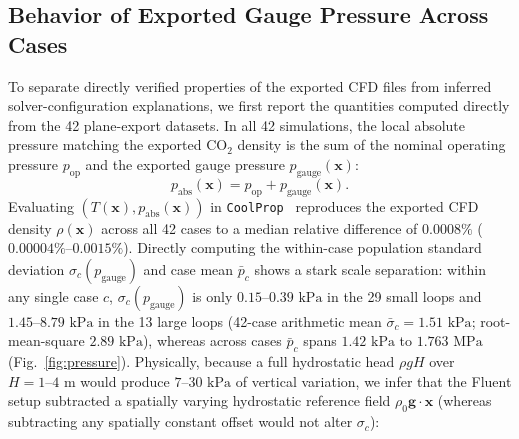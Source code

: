 \documentclass[11pt]{article}
\begin{document}
\subsection{Behavior of Exported Gauge Pressure Across Cases}
To separate directly verified properties of the exported CFD files from inferred solver-configuration explanations, we first report the quantities computed directly from the 42 plane-export datasets. In all 42 simulations, the local absolute pressure matching the exported $\mathrm{CO}_2$ density is the sum of the nominal operating pressure $p_{\mathrm{op}}$ and the exported gauge pressure $p_{\mathrm{gauge}}(\mathbf{x})$:
\begin{equation}
  p_{\mathrm{abs}}(\mathbf{x}) = p_{\mathrm{op}} + p_{\mathrm{gauge}}(\mathbf{x}).
  \label{eq:piezometric}
\end{equation}
Evaluating $(T(\mathbf{x}), p_{\mathrm{abs}}(\mathbf{x}))$ in \texttt{CoolProp}~\cite{span1996new,bell2014pure} reproduces the exported CFD density $\rho(\mathbf{x})$ across all 42 cases to a median relative difference of $0.0008\%$ ($0.00004\%\text{--}0.0015\%$). Directly computing the within-case population standard deviation $\sigma_c(p_{\mathrm{gauge}})$ and case mean $\bar{p}_c$ shows a stark scale separation: within any single case $c$, $\sigma_c(p_{\mathrm{gauge}})$ is only $0.15\text{--}0.39\text{ kPa}$ in the 29 small loops and $1.45\text{--}8.79\text{ kPa}$ in the 13 large loops (42-case arithmetic mean $\bar{\sigma}_c = 1.51\text{ kPa}$; root-mean-square $2.89\text{ kPa}$), whereas across cases $\bar{p}_c$ spans $1.42\text{ kPa}$ to $1.763\text{ MPa}$ (Fig.~\ref{fig:pressure}). Physically, because a full hydrostatic head $\rho g H$ over $H = 1\text{--}4\text{ m}$ would produce $7\text{--}30\text{ kPa}$ of vertical variation, we infer that the Fluent setup subtracted a spatially varying hydrostatic reference field $\rho_0 \mathbf{g}\cdot\mathbf{x}$ (whereas subtracting any spatially constant offset would not alter $\sigma_c$):
\end{document}
